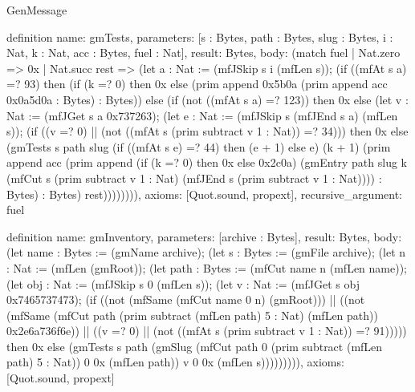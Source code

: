 \begin{lexlean}{GenMessage}
\begin{semanticmodule}
definition{
  name: gmTests,
  parameters: [s : Bytes, path : Bytes, slug : Bytes, i : Nat, k : Nat, acc : Bytes, fuel : Nat],
  result: Bytes,
  body: (match fuel
    | Nat.zero => 0x
    | Nat.succ rest => (let a : Nat := (mfJSkip s i (mfLen s)); (if ((mfAt s a) =? 93) then (if (k =? 0) then 0x else (prim append 0x5b0a (prim append acc 0x0a5d0a : Bytes) : Bytes)) else (if (not ((mfAt s a) =? 123)) then 0x else (let v : Nat := (mfJGet s a 0x737263); (let e : Nat := (mfJSkip s (mfJEnd s a) (mfLen s)); (if ((v =? 0) || (not ((mfAt s (prim subtract v 1 : Nat)) =? 34))) then 0x else (gmTests s path slug (if ((mfAt s e) =? 44) then (e + 1) else e) (k + 1) (prim append acc (prim append (if (k =? 0) then 0x else 0x2c0a) (gmEntry path slug k (mfCut s (prim subtract v 1 : Nat) (mfJEnd s (prim subtract v 1 : Nat)))) : Bytes) : Bytes) rest)))))))),
  axioms: [Quot.sound, propext],
  recursive_argument: fuel
}

definition{
  name: gmInventory,
  parameters: [archive : Bytes],
  result: Bytes,
  body: (let name : Bytes := (gmName archive); (let s : Bytes := (gmFile archive); (let n : Nat := (mfLen (gmRoot)); (let path : Bytes := (mfCut name n (mfLen name)); (let obj : Nat := (mfJSkip s 0 (mfLen s)); (let v : Nat := (mfJGet s obj 0x7465737473); (if ((not (mfSame (mfCut name 0 n) (gmRoot))) || ((not (mfSame (mfCut path (prim subtract (mfLen path) 5 : Nat) (mfLen path)) 0x2e6a736f6e)) || ((v =? 0) || (not ((mfAt s (prim subtract v 1 : Nat)) =? 91))))) then 0x else (gmTests s path (gmSlug (mfCut path 0 (prim subtract (mfLen path) 5 : Nat)) 0 0x (mfLen path)) v 0 0x (mfLen s))))))))),
  axioms: [Quot.sound, propext]
}
\end{semanticmodule}
\end{lexlean}
